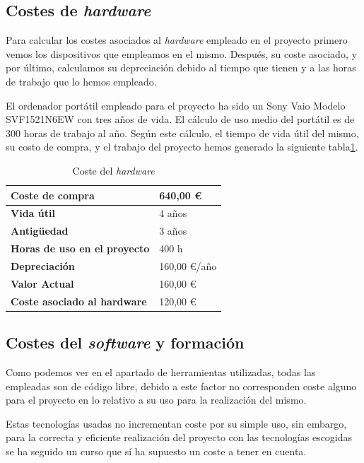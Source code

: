 \subsection{Costes de \textit{hardware}}
Para calcular los costes asociados al \textit{hardware} empleado en el proyecto primero vemos los dispositivos que empleamos en el mismo. Después, su coste asociado, y por último, calculamos su depreciación debido al tiempo que tienen y a las horas de trabajo que lo hemos empleado.


El ordenador portátil empleado para el proyecto ha sido un Sony Vaio Modelo SVF1521N6EW con tres años de vida. El cálculo de uso medio del portátil es de 300 horas de trabajo al año. Según este cálculo, el tiempo de vida útil del mismo, su costo de compra, y el trabajo del proyecto hemos generado la siguiente tabla\ref{fig:coste_hw}.


\begin{table}[htpb]
\centering
\begin{tabular}{|l|l|}
\hline
\textbf{Coste de compra}             & 640,00 \euro     \\ \hline
\textbf{Vida útil}                   & 4 años       \\ \hline
\textbf{Antigüedad}                  & 3 años       \\ \hline
\textbf{Horas de uso en el proyecto} & 400 h        \\ \hline
\textbf{Depreciación}                & 160,00 \euro/año \\ \hline
\textbf{Valor Actual}                & 160,00 \euro     \\ \hline
\textbf{Coste asociado al hardware}  & 120,00 \euro     \\ \hline
\end{tabular}
\caption{Coste del \textit{hardware}}
\label{fig:coste_hw}
\end{table}


\subsection{Costes del \textit{software} y formación}
Como podemos ver en el apartado de herramientas utilizadas, todas las empleadas son de código libre, debido a este factor no corresponden coste alguno para el proyecto en lo relativo a su uso para la realización del mismo.


Estas tecnologías usadas no incrementan coste por su simple uso, sin embargo, para la correcta y eficiente realización del proyecto con las tecnologías escogidas se ha seguido un curso que sí ha supuesto un coste a tener en cuenta.


